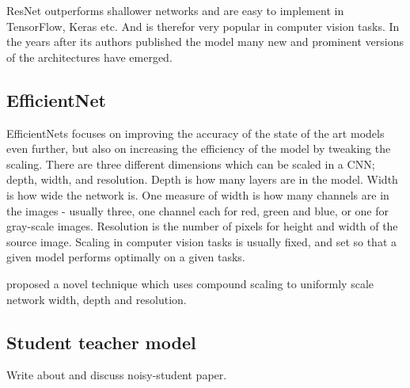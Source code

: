 \documentclass[thesis.tex]{subfiles}
\begin{document}

ResNet outperforms shallower networks and are easy to implement in TensorFlow, Keras etc. And is therefor very popular in computer vision tasks. In the years after its authors published the model many new and prominent versions of the architectures have emerged.




\subsection{EfficientNet}
EfficientNets \cite{EfficientNetRethinking19} focuses on improving the accuracy of the state of the art models even further, but also on increasing the efficiency of the model by tweaking the scaling. There are three different dimensions which can be scaled in a CNN; depth, width, and resolution. Depth is how many layers are in the model. Width is how wide the network is. One measure of width is how many channels are in the images - usually three, one  channel each for red, green and blue, or one for gray-scale images. Resolution is the number of pixels for height and width of the source image. Scaling in computer vision tasks is usually fixed, and set so that a given model performs optimally on a given tasks. 



\citeauthor*{EfficientNetRethinking19} proposed a novel technique which uses compound scaling to uniformly scale network width, depth and resolution.




\subsection{Student teacher model}
Write about and discuss noisy-student paper.
\end{document}
